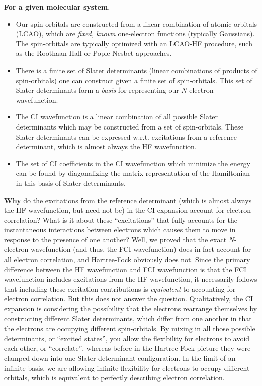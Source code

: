 \documentclass{article}
\begin{document}
\textbf{For a given molecular system},
\begin{itemize}
\item Our spin-orbitals are constructed from a linear combination of atomic orbitals (LCAO), which are \textit{fixed, known} one-electron functions (typically Gaussians). 
The spin-orbitals are typically optimized with an LCAO-HF procedure, such as the Roothaan-Hall or Pople-Nesbet approaches. 
\item There is a finite set of Slater determinants (linear combinations of products of spin-orbitals) one can construct given a finite set of spin-orbitals. This set of Slater determinants form a \textit{basis} for representing our $N$-electron wavefunction.
\item The CI wavefunction is a linear combination of all possible Slater determinants which may be constructed from a set of spin-orbitals. These Slater determinants
can be expressed w.r.t. excitations from a reference determinant, which is almost always the HF wavefunction. 
\item The set of CI coefficients in the CI wavefunction which minimize the energy can be found by diagonalizing the matrix representation of the Hamiltonian in this basis 
of Slater determinants. 
\end{itemize}

\textbf{Why} do the excitations from the reference determinant (which is almost always the HF wavefunction, but need not be) in the CI expansion account for electron correlation?
What is it about these ``excitations'' that fully accounts for the instantaneous interactions between electrons which causes them to move in response to the presence of one another? 
Well, we proved that the exact $N$-electron wavefunction (and thus, the FCI wavefunction) does in fact account for all electron correlation, and Hartree-Fock obviously does not.
Since the primary difference between the HF wavefunction and FCI wavefunction is that the FCI wavefunction includes excitations from the HF wavefunction, it necessarily
follows that including these excitation contributions is \textit{equivalent} to accounting for electron correlation.
But this does not answer the question.
Qualitatively, the CI expansion is considering the possibility that the electrons rearrange themselves by constructing different Slater determinants, which differ from one another in that 
the electrons are occupying different spin-orbitals. 
By mixing in all those possible determinants, or ``excited states'', you allow the flexibility for electrons to avoid each other, or ``correlate'',
    whereas before in the Hartree-Fock picture they were clamped down into one Slater determinant configuration. 
In the limit of an infinite basis, we are allowing infinite flexibility for electrons to occupy different orbitals, which is equivalent to perfectly describing electron correlation.
\end{document}
